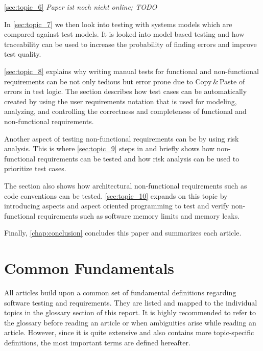 \autoref{sec:topic_6} %
\textit{Paper ist noch nicht online; TODO}

In \autoref{sec:topic_7} %
we then look into testing with systems models which are compared against test models.
It is looked into model based testing and how traceability can be used to increase the probability of finding errors and improve test quality.

\autoref{sec:topic_8} %
explains why writing manual tests for functional and non-functional requirements can be  not only tedious but error prone due to Copy\,\&\,Paste of errors in test logic.
The section describes how test cases can be automatically created by using the user requirements notation that is used for modeling, analyzing, and controlling the correctness and completeness of functional and non-functional requirements.

Another aspect of testing non-functional requirements can be by using risk analysis.
This is where \autoref{sec:topic_9}%
steps in and briefly shows how non-functional requirements can be tested and how risk analysis can be used to prioritize test cases.

The section also shows how architectural non-functional requirements such as code conventions can be tested.
\autoref{sec:topic_10} %
expands on this topic by introducing aspects and aspect oriented programming to test and verify non-functional requirements such as software memory limits and memory leaks.

Finally, \autoref{chap:conclusion} concludes this paper and summarizes each article.

\section{Common Fundamentals}\label{sec:introduction_common_fundamentals}
All articles build upon a common set of fundamental definitions regarding software testing and requirements.
They are listed and mapped to the individual topics in the glossary section of this report.
It is highly recommended to refer to the glossary before reading an article or when ambiguities arise while reading an article.
However, since it is quite extensive and also contains more topic-specific definitions, the most important terms are defined hereafter.


